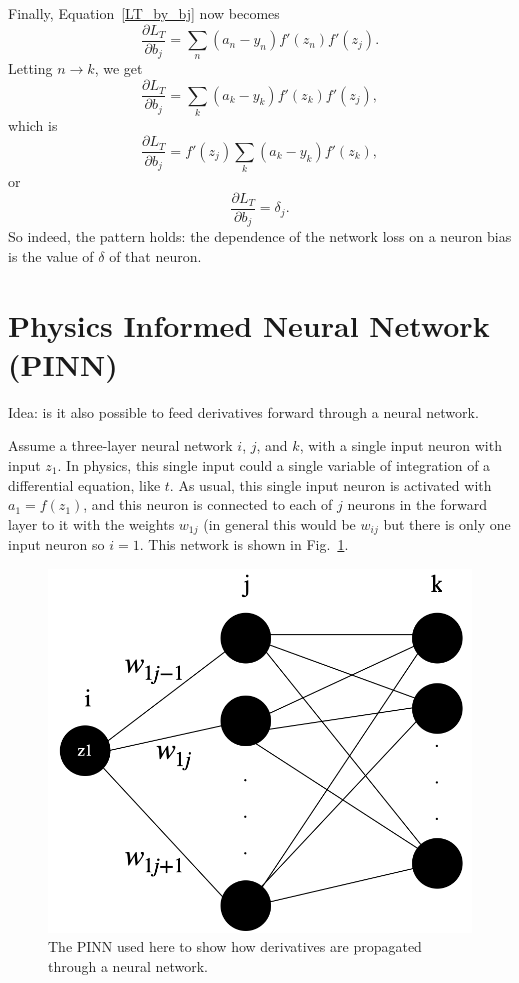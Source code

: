 \documentclass[12pt]{article}
\begin{document}
Finally, Equation~\ref{LT_by_bj} now becomes
\begin{equation}
\frac{\partial L_T}{\partial b_j}=\sum_n (a_n-y_n)f'(z_n)f'(z_j).
\end{equation}
Letting $n\rightarrow k$, we get
\begin{equation}
\frac{\partial L_T}{\partial b_j}=\sum_k (a_k-y_k)f'(z_k)f'(z_j),
\end{equation}
which is 
\begin{equation}
\frac{\partial L_T}{\partial b_j}=f'(z_j)\sum_k (a_k-y_k)f'(z_k),
\end{equation}
or 
\begin{equation}
\frac{\partial L_T}{\partial b_j}=\delta_j.
\end{equation}
So indeed, the pattern holds: the dependence of the network loss on a neuron bias is the value of $\delta$ of that  neuron. 


\section{Physics Informed Neural Network (PINN)}

Idea: is it also possible to feed derivatives forward through a neural network.

Assume a three-layer neural network $i$, $j$, and $k$, with a single input neuron with input $z_1$. In physics, this single input could a single variable of integration of a differential equation, like $t$. As usual, this single input neuron is activated with $a_1=f(z_1)$, and this neuron is connected to each of $j$ neurons in the forward layer to it with the weights $w_{1j}$ (in general this would be $w_{ij}$ but there is only one input neuron so $i=1$.   This network is shown in Fig.~\ref{pinn01}.
\begin{figure}[h]
\begin{center}
\includegraphics[scale=0.2]{Figs/pinn.png}
\caption{The PINN used here to show how derivatives are propagated through a neural network.}
\label{pinn01}
\end{center}
\end{figure}
\end{document}
